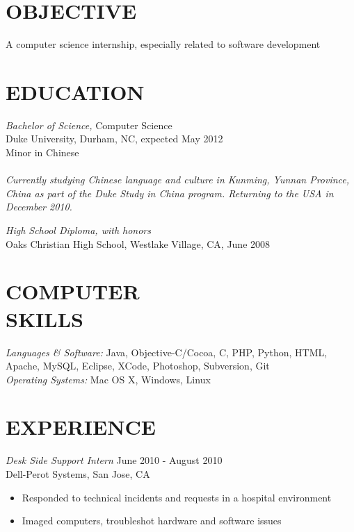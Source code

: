 \documentclass[line,margin]{res}
\begin{document}
	\setlength{\pdfpageheight}{\paperheight}
	\setlength{\pdfpagewidth}{\paperwidth}
\address{Duke University, Box 94807, Durham, NC 27708}
\address{alex@galonsky.com \hspace{.93in} REDACTED}

 
\begin{resume}
 
\section{OBJECTIVE}       A computer science internship, especially related to software development
 
 
\section{EDUCATION} {\sl Bachelor of Science,} Computer Science \\
                Duke University, Durham, NC, 
                expected May 2012 \\
				Minor in Chinese \\ \\
				{\sl Currently studying Chinese language and culture in Kunming, Yunnan Province, China as part of the Duke Study in China program.  Returning to the USA in December 2010.}

				{\sl High School Diploma, with honors} \\
				Oaks Christian High School, Westlake Village, CA, June 2008
 
 
\section{COMPUTER \\ SKILLS} {\sl Languages \& Software:} Java, Objective-C/Cocoa, C, PHP, Python, HTML, Apache, MySQL, Eclipse, XCode, Photoshop, Subversion, Git \\
                {\sl Operating Systems:} Mac OS X, Windows, Linux
 
\section{EXPERIENCE} 
				
	{\sl Desk Side Support Intern} \hfill June 2010 - August 2010 \\
                Dell-Perot Systems, San Jose, CA
                 \begin{itemize}  \itemsep -2pt %
                 \item Responded to technical incidents and requests in a hospital environment
		 \item Imaged computers, troubleshot hardware and software issues
                \end{itemize}


\end{resume}
\end{document}
